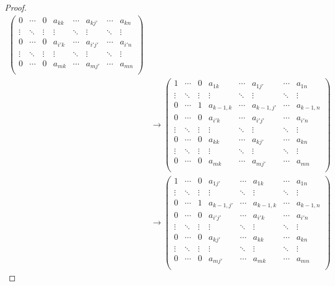 \documentclass[dvipdfmx]{jsarticle}
\begin{document}
\begin{proof}
\begin{align*}
\begin{pmatrix}
0 & \cdots & 0 & a_{kk} & \cdots & a_{kj'} & \cdots & a_{kn} \\
 \vdots & \ddots & \vdots & \vdots & \ddots & \vdots & \ddots & \vdots \\
0 & \cdots & 0 & a_{i'k} & \cdots & a_{i'j'} & \cdots & a_{i'n} \\
 \vdots & \ddots & \vdots & \vdots & \ddots & \vdots & \ddots & \vdots \\
0 & \cdots & 0 & a_{mk} & \cdots & a_{mj'} & \cdots & a_{mn} \\
\end{pmatrix}\\
&\rightarrow \begin{pmatrix}
1 & \cdots & 0 & a_{1k} & \cdots & a_{1j'} & \cdots & a_{1n} \\
 \vdots & \ddots & \vdots & \vdots & \ddots & \vdots & \ddots & \vdots \\
0 & \cdots & 1 & a_{k - 1,k} & \cdots & a_{k - 1,j'} & \cdots & a_{k - 1,n} \\
0 & \cdots & 0 & a_{i'k} & \cdots & a_{i'j'} & \cdots & a_{i'n} \\
 \vdots & \ddots & \vdots & \vdots & \ddots & \vdots & \ddots & \vdots \\
0 & \cdots & 0 & a_{kk} & \cdots & a_{kj'} & \cdots & a_{kn} \\
 \vdots & \ddots & \vdots & \vdots & \ddots & \vdots & \ddots & \vdots \\
0 & \cdots & 0 & a_{mk} & \cdots & a_{mj'} & \cdots & a_{mn} \\
\end{pmatrix}\\
&\rightarrow \begin{pmatrix}
1 & \cdots & 0 & a_{1j'} & \cdots & a_{1k} & \cdots & a_{1n} \\
 \vdots & \ddots & \vdots & \vdots & \ddots & \vdots & \ddots & \vdots \\
0 & \cdots & 1 & a_{k - 1,j'} & \cdots & a_{k - 1,k} & \cdots & a_{k - 1,n} \\
0 & \cdots & 0 & a_{i'j'} & \cdots & a_{i'k} & \cdots & a_{i'n} \\
 \vdots & \ddots & \vdots & \vdots & \ddots & \vdots & \ddots & \vdots \\
0 & \cdots & 0 & a_{kj'} & \cdots & a_{kk} & \cdots & a_{kn} \\
 \vdots & \ddots & \vdots & \vdots & \ddots & \vdots & \ddots & \vdots \\
0 & \cdots & 0 & a_{mj'} & \cdots & a_{mk} & \cdots & a_{mn} \\

\end{pmatrix}
\end{align*}
\end{proof}
\end{document}
